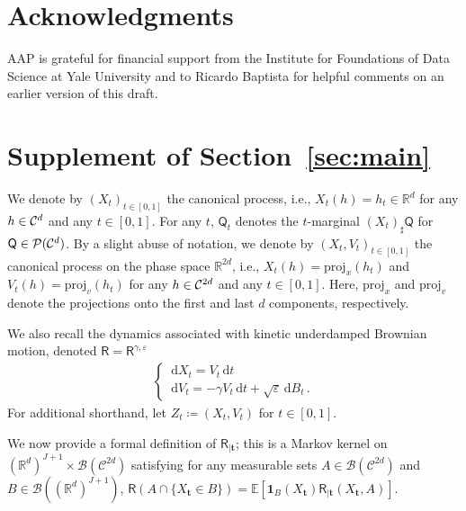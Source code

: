 \documentclass[12pt]{article}
\theoremstyle{plain}
\theoremstyle{plain}
\theoremstyle{remark}
\newcommand{\R}{\mathbb{R}}
\newcommand{\dd}{\,\mathrm{d}}
\newcommand*{\defeq}{\coloneqq}
\newcommand{\msf}[1]{\mathsf{#1}}
\newcommand{\eps}{\varepsilon}
\newcommand{\rset}{\mathbb{R}}
\def\rset{\mathbb{R}}
\newcommand{\PE}{\mathbb{E}}
\newcommand{\1}{\bm{1}}
\theoremstyle{plain}
\theoremstyle{definition}
\theoremstyle{remark}
\begin{document}
\section*{Acknowledgments}
AAP is grateful for financial support from the Institute for Foundations of Data Science at Yale University and to Ricardo Baptista for helpful comments on an earlier version of this draft.




\newpage
\appendix
\section{Supplement of Section~\ref{sec:main}}
\label{sec:supp_section_main}
We denote by $(X_t)_{t\in[0,1]}$ the canonical process, i.e., $X_t(h) = h_t \in \R^d$ for any $h \in {\cal C}^d$ and any $t \in [0, 1]$. For any $t$, $\msf Q_t$ denotes the $t$-marginal $(X_t)_\sharp \msf Q$ for $\msf Q \in \mathcal{P}({\cal C}^d)$. By a slight abuse of notation, we denote by $(X_t,V_t)_{t\in[0,1]}$ the canonical process on the phase space $\rset^{2d}$, i.e., $X_t(h) = \mathrm{proj}_x(h_t)$ and $V_t(h) = \mathrm{proj}_v(h_t)$ for any $h \in {\cal C}^{2d}$ and any $t \in [0, 1]$. Here, $\mathrm{proj}_x$ and $\mathrm{proj}_v$ denote the projections onto the first and last $d$ components, respectively.

We also recall the dynamics associated with kinetic underdamped Brownian motion, denoted $\msf R = \msf R^{\gamma,\eps}$
\begin{align}\label{eq:ref_proc}
    \begin{cases}
        \dd X_t = V_t\dd t \\
        \dd V_t = -\gamma V_t \dd t + \sqrt{\varepsilon} \dd B_t\,.
    \end{cases}
\end{align}
For additional shorthand, let $Z_t \defeq (X_t,V_t)$ for $t \in [0,1]$.

We now provide a formal definition of $\msf R_{|\bm t}$; this is a Markov kernel on $(\rset^{d})^{J+1} \times \mathcal{B}(\mathcal{C}^{2d})$ satisfying for any measurable sets $A \in \mathcal{B}(\mathcal{C}^{2d})$ and $B \in \mathcal{B}((\rset^d)^{J+1})$, $\msf R(A\cap \{X_{\bm t} \in B\}) = \PE[\1_{B}(X_{\bm t}) \msf R_{|\bm t}(X_{\bm t},A)]$.
\end{document}
